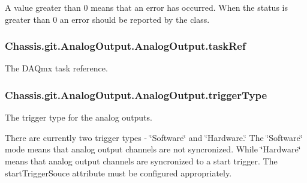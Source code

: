 A value greater than 0 means that an error has occurred. When the status is greater than 0 an error should be reported by the class. \hypertarget{class_chassis_8git_1_1_analog_output_1_1_analog_output_a85213a49732be73c70723a37e03e9c5b}{
\subsubsection[{task\-Ref}]{\setlength{\rightskip}{0pt plus 5cm}Chassis.\-git.\-Analog\-Output.\-Analog\-Output.\-task\-Ref}}\label{class_chassis_8git_1_1_analog_output_1_1_analog_output_a85213a49732be73c70723a37e03e9c5b}


The D\-A\-Qmx task reference. 

\hypertarget{class_chassis_8git_1_1_analog_output_1_1_analog_output_ad8b0482efeef548c4443affd2957fbdb}{
\subsubsection[{trigger\-Type}]{\setlength{\rightskip}{0pt plus 5cm}Chassis.\-git.\-Analog\-Output.\-Analog\-Output.\-trigger\-Type}}\label{class_chassis_8git_1_1_analog_output_1_1_analog_output_ad8b0482efeef548c4443affd2957fbdb}


The trigger type for the analog outputs. 

There are currently two trigger types -\/ \char`\"{}\-Software\char`\"{} and \char`\"{}\-Hardware.\char`\"{} The \char`\"{}\-Software\char`\"{} mode means that analog output channels are not syncronized. While \char`\"{}\-Hardware\char`\"{} means that analog output channels are syncronized to a start trigger. The start\-Trigger\-Souce attribute must be configured appropriately. 

